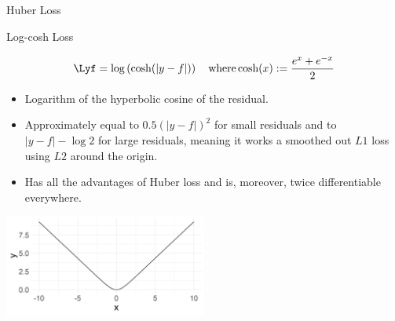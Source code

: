 \documentclass[11pt,compress,t,notes=noshow, xcolor=table]{beamer}
\begin{document}
\begin{vbframe}{Huber Loss}


\end{vbframe}

\begin{vbframe}{Log-cosh Loss }


$$
\Lyf = \log \left( \cosh(\left|y - f\right|) \right) \quad \text{where}\,\text{cosh}(x):=\frac{e^x+e^{-x}}{2}
$$

\normalsize
\begin{itemize}
\item Logarithm of the hyperbolic cosine of the residual.
\item Approximately equal to $0.5 (\left|y - f\right|)^2$ for small residuals and to $\left|y - f\right| - \log 2$ for large residuals, meaning it works a smoothed out $L1$ loss using $L2$ around the origin. %
\item Has all the advantages of Huber loss and is, moreover, twice differentiable everywhere.
\end{itemize}

\begin{center}
\includegraphics[width = 0.5\textwidth]{figure/loss_logcosh.png}
\end{center}


\end{vbframe}
\end{document}
